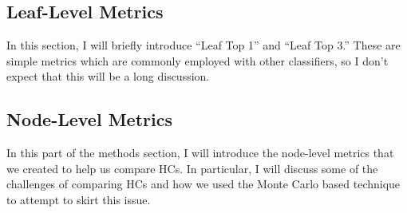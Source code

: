 \documentclass[../thesis.tex]{subfiles}
\begin{document}
\subsection{Leaf-Level Metrics}
In this section, I will briefly introduce ``Leaf Top 1'' and ``Leaf Top 3.'' These are simple metrics which are commonly employed with other classifiers, so I don't expect that this will be a long discussion.

\subsection{Node-Level Metrics}
In this part of the methods section, I will introduce the node-level metrics that we created to help us compare HCs. In particular, I will discuss some of the challenges of comparing HCs and how we used the Monte Carlo based technique to attempt to skirt this issue. 
\end{document}
